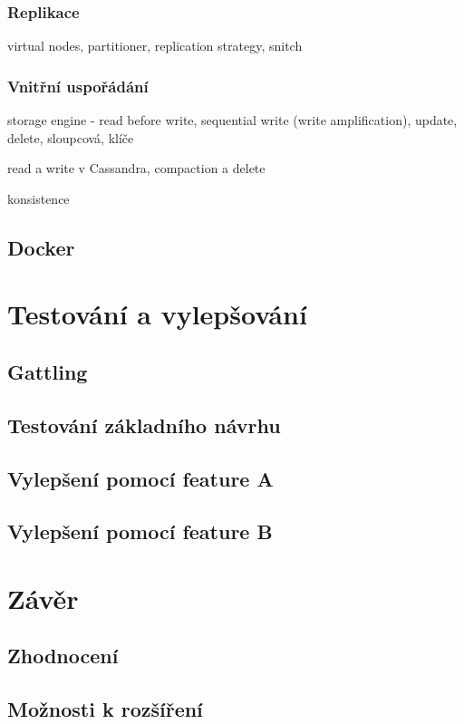 \documentclass[FM,DP]{tulthesis}
\begin{document}
\subsection{Replikace}

virtual nodes, partitioner, replication strategy, snitch

\subsection{Vnitřní uspořádání}

storage engine - read before write, sequential write (write amplification), update, delete, sloupcová, klíče

read a write v Cassandra, compaction a delete

konsistence

\section{Docker}

\chapter{Testování a vylepšování}

\section{Gattling}

\section{Testování základního návrhu}

\section{Vylepšení pomocí feature A}

\section{Vylepšení pomocí feature B}

\chapter{Závěr}

\section{Zhodnocení}

\section{Možnosti k rozšíření}
	
\begin{thebibliography}{Per00}

\end{thebibliography}
\end{document}
